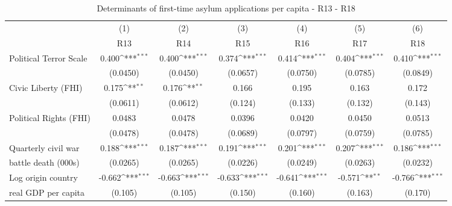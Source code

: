 \begin{table}[htbp]\centering \scriptsize
\def\sym#1{\ifmmode^{#1}\else\(^{#1}\)\fi}
\caption{Determinants of first-time asylum applications per capita - R13 - R18}
\begin{tabular}{l*{6}{c}}
\hline\hline
	&\multicolumn{1}{c}{(1)}     &\multicolumn{1}{c}{(2)}       &\multicolumn{1}{c}{(3)}       &\multicolumn{1}{c}{(4)}    	&\multicolumn{1}{c}{(5)}  	&\multicolumn{1}{c}{(6)}   \\
                    &\multicolumn{1}{c}{R13}         &\multicolumn{1}{c}{R14}         &\multicolumn{1}{c}{R15}         &\multicolumn{1}{c}{R16}         &\multicolumn{1}{c}{R17}         &\multicolumn{1}{c}{R18}         \\
\hline
Political Terror Scale&       0.400\sym{***}&       0.400\sym{***}&       0.374\sym{***}&       0.414\sym{***}&       0.404\sym{***}&       0.410\sym{***}\\
                    &    (0.0450)         &    (0.0450)         &    (0.0657)         &    (0.0750)         &    (0.0785)         &    (0.0849)         \\
[0.5em]
Civic Liberty (FHI) &       0.175\sym{**} &       0.176\sym{**} &       0.166         &       0.195         &       0.163         &       0.172         \\
                    &    (0.0611)         &    (0.0612)         &     (0.124)         &     (0.133)         &     (0.132)         &     (0.143)         \\
[0.5em]
Political Rights (FHI)&      0.0483         &      0.0478         &      0.0396         &      0.0420         &      0.0450         &      0.0513         \\
                    &    (0.0478)         &    (0.0478)         &    (0.0689)         &    (0.0797)         &    (0.0759)         &    (0.0785)         \\
[0.5em]
Quarterly civil war&       0.188\sym{***}&       0.187\sym{***}&       0.191\sym{***}&       0.201\sym{***}&       0.207\sym{***}&       0.186\sym{***}\\
 battle death (000s)                    &    (0.0265)         &    (0.0265)         &    (0.0226)         &    (0.0249)         &    (0.0263)         &    (0.0232)         \\
[0.5em]
Log origin country &      -0.662\sym{***}&      -0.663\sym{***}&      -0.633\sym{***}&      -0.641\sym{***}&      -0.571\sym{**} &      -0.766\sym{***}\\
real GDP per capita                   &     (0.105)         &     (0.105)         &     (0.150)         &     (0.160)         &     (0.163)         &     (0.170)         \\

\end{tabular}
\end{table}
